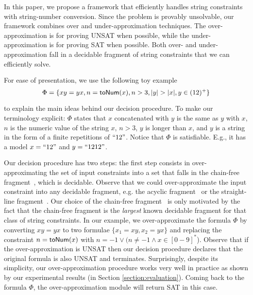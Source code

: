 \documentclass[sigplan,review,anonymous]{acmart}\settopmatter{printfolios=true,printccs=false,printacmref=false}
\begin{document}
In this paper, we propose a framework that efficiently handles string constraints with string-number conversion. Since the problem is provably unsolvable, our framework combines over and under-approximation techniques. The over-approximation is for proving UNSAT when possible, while the under-approximation is for proving SAT when possible. Both over- and under-approximation fall in a decidable fragment of string constraints that  we can efficiently solve. 



For ease of presentation, we  use the following toy example $$\Phi = \{xy=yx, n = \sti{x}, n >3 ,|y|>|x|, y \in (12)^+\}$$

to explain the main ideas behind our decision procedure.  To make our terminology explicit: $\Phi$ states that $x$ concatenated with $y$ is the same as $y$ with $x$, $n$ is the numeric value of the string $x$, $n > 3$, $y$ is longer than $x$, and $y$ is a string in the form of a finite repetitions of $``12"$.  Notice that $\Phi$ is satisfiable. E.g., it has a model $x=``12"$ and $y=``1212"$.


Our decision procedure has two steps: the first step consists in over-approximating the set of input constraints into a set that falls in the chain-free fragment~\cite{abdulla2019chain}, which is decidable. Observe that we could  over-approximate the input constraint into any decidable fragment, e.g. the acyclic fragment~\cite{abdulla2014string} or the straight-line fragment~\cite{chen2019decision}. Our choice of the  chain-free fragment~\cite{abdulla2019chain} is only motivated by the fact that the chain-free fragment is the {\em largest} known decidable fragment for that class of string constraints. In our example, we over-approximate the formula $\Phi$ by converting $xy=yx$ to two formulae $\{x_1=xy, x_2=yx\}$  and replacing the constraint $n=\mbox{\textsf{toNum}($x$)}$ with $n=-1 \vee (n\neq -1 \wedge x\in [0-9]^*$). 
Observe that if the over-approximation is UNSAT then our decision procedure  declares that the original formula is also UNSAT and terminates. Surprisingly, despite its simplicity, our over-approximation procedure works very well in practice as shown by our experimental results  (in Section \ref{section:evaluation}). Coming back to the formula $\Phi$, the over-approximation module will  return SAT  in this case. 
\end{document}

